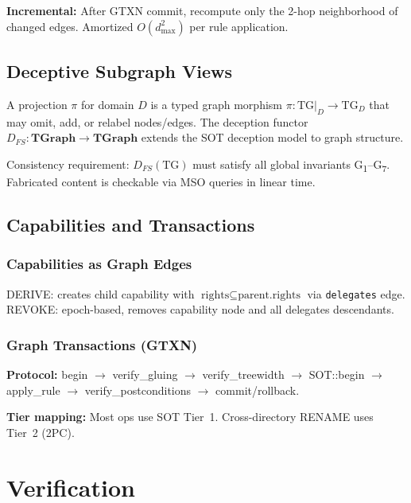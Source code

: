 \documentclass[11pt,a4paper,twoside]{report}
\theoremstyle{definition}
\newcommand{\TG}{\mathrm{TG}}
\begin{document}
\textbf{Incremental:} After GTXN commit, recompute only the 2-hop neighborhood of changed edges. Amortized $O(d_{\max}^2)$ per rule application.

\chapter{Deceptive Subgraph Views}

A projection $\pi$ for domain $D$ is a typed graph morphism
$\pi: \TG|_D \to \TG_D$ that may omit, add, or relabel nodes/edges.
The deception functor $D_{FS}: \textbf{TGraph} \to \textbf{TGraph}$ extends
the SOT deception model to graph structure.

Consistency requirement: $D_{FS}(\TG)$ must satisfy all global invariants G\textsubscript{1}--G\textsubscript{7}.
Fabricated content is checkable via MSO queries in linear time.

\chapter{Capabilities and Transactions}

\section{Capabilities as Graph Edges}
DERIVE: creates child capability with $\text{rights} \subseteq \text{parent.rights}$ via \texttt{delegates} edge.
REVOKE: epoch-based, removes capability node and all delegates descendants.

\section{Graph Transactions (GTXN)}
\textbf{Protocol:} begin $\to$ verify\_gluing $\to$ verify\_treewidth $\to$ SOT::begin $\to$ apply\_rule $\to$ verify\_postconditions $\to$ commit/rollback.

\textbf{Tier mapping:} Most ops use SOT Tier~1. Cross-directory RENAME uses Tier~2 (2PC).

\part{Verification}
\end{document}
